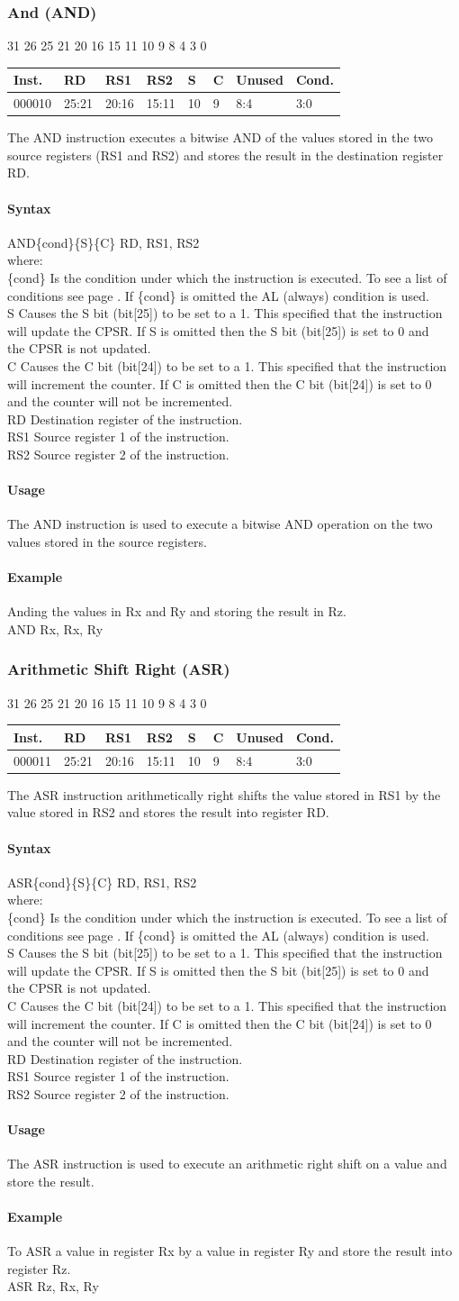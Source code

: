 \documentclass[12pt]{article}
\newcommand{\aTypeInstruction}[6]
{%
    \hspace{1.6cm}31 \hspace{1.15cm}26 \hspace{.04cm}25 \hspace{.8cm}21 \hspace{.04cm}20 \hspace{.8cm}16 \hspace{.04cm}15 \hspace{.8cm}11 \hspace{.04cm}10 \hspace{.275cm}9 \hspace{.275cm}8 \hspace{1.175cm}4 \hspace{.04cm}3 \hspace{1.25cm}0
    \vspace{-.25cm}
    \begin{center}
        \begin{tabular}{ |p{1.8cm}|p{1.5cm}|p{1.5cm}|p{1.5cm}|p{0.3cm}|p{0.3cm}|p{1.5cm}|p{1.5cm}| }
            \hline
            \textbf{Inst.} & \textbf{RD}& \textbf{RS1} & \textbf{RS2} & \textbf{S} & \textbf{C} & Unused & \textbf{Cond.}\\
            \hline
            #1 & 25:21 & 20:16 & 15:11 & 10 & 9 & 8:4 &3:0\\
            \hline
        \end{tabular}
    \end{center}
    
    \noindent
    #2\\
    
    \paragraph{Syntax}
    \begin{flushleft}
    #3\{cond\}\{S\}\{C\} RD, RS1, RS2\\
    \vspace{1em}        %
    where:\\
    \vspace{1em}
    \{cond\}    \hspace{2em} Is the condition under which the instruction is executed. To see a list of\\
                \hspace{5.4em} conditions see page . If \{cond\} is omitted the AL (always) condition is used.\\
    \vspace{1em}    
    S       \hspace{4.5em} Causes the S bit (bit[25]) to be set to a 1. This specified that the instruction\\
            \hspace{5.4em} will update the CPSR. If S is omitted then the S bit (bit[25]) is set to 0 and\\
            \hspace{5.4em} the CPSR is not updated.\\
    \vspace{1em}    
    C       \hspace{4.5em} Causes the C bit (bit[24]) to be set to a 1. This specified that the instruction\\
            \hspace{5.4em} will increment the counter. If C is omitted then the C bit (bit[24]) is set to 0\\
            \hspace{5.4em} and the counter will not be incremented.\\
    \vspace{1em}
    RD  \hspace{3.6em} Destination register of the instruction.\\
    \vspace{1em}
    RS1  \hspace{3.35em} Source register 1 of the instruction.\\
    \vspace{1em}
    RS2  \hspace{3.35em} Source register 2 of the instruction.\\
    \end{flushleft}
    
    \paragraph{Usage}
    \begin{flushleft}
    #4\\
    \end{flushleft}
    \paragraph{Example}
    \begin{flushleft}
    #5\\
    \vspace{1em}
    #6
    \end{flushleft}
    }
\begin{document}



    \newpage
    \subsubsection{And (AND)}
    
    \aTypeInstruction
    {000010}
    {The AND instruction executes a bitwise AND of the values stored in the two source registers (RS1 and RS2) and stores the result in the destination register RD.}
    {AND}
    {The AND instruction is used to execute a bitwise AND operation on the two values stored in the source registers.}
    {Anding the values in Rx and Ry and storing the result in Rz.}
    {AND Rx, Rx, Ry}
   
   




    \newpage
    \subsubsection{Arithmetic Shift Right (ASR)}
    
    \aTypeInstruction
    {000011}
    {The ASR instruction arithmetically right shifts the value stored in RS1 by the value stored in RS2 and stores the result into register RD.}
    {ASR}
    {The ASR instruction is used to execute an arithmetic right shift on a value and store the result.}
    {To ASR a value in register Rx by a value in register Ry and store the result into register Rz.}
    {ASR Rz, Rx, Ry}
    
\end{document}
